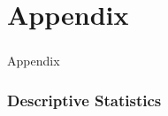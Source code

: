 \documentclass{beamer}
\begin{document}
	\section{Appendix}
	\begin{frame}
		\centering
		\frametitle{}
	\huge{Appendix}
	\end{frame}




\begin{frame}
	\frametitle{Descriptive Statistics}
\begin{table}[htbp]
  \centering
  \footnotesize
	  \resizebox{0.7\textwidth}{!}{
	
	\label{tab:summary}%
	}
\end{table}
	\end{frame}
\end{document}
